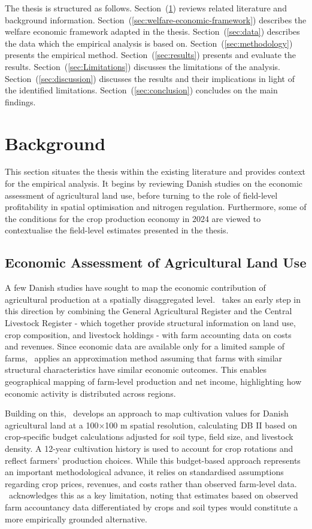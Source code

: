 \documentclass[12pt]{article}
\begin{document}
The thesis is structured as follows. Section~(\ref{sec:background}) reviews related literature and background information. 
Section~(\ref{sec:welfare-economic-framework}) describes the welfare economic framework adapted in the thesis.
Section~(\ref{sec:data}) describes the data which the empirical analysis is based on.
Section~(\ref{sec:methodology}) presents the empirical method.
Section~(\ref{sec:results}) presents and evaluate the results.
Section~(\ref{sec:Limitations}) discusses the limitations of the analysis.
Section~(\ref{sec:discussion}) discusses the results and their implications in light of the identified limitations.
Section~(\ref{sec:conclusion}) concludes on the main findings. 


\newpage


\section{Background}
\label{sec:background}
This section situates the thesis within the existing literature and provides context for the empirical analysis. It begins by reviewing Danish studies on the economic assessment of agricultural land use, before turning to the role of field-level profitability in spatial optimisation and nitrogen regulation. 
Furthermore, some of the conditions for the crop production economy in 2024 are viewed to contextualise the field-level estimates presented in the thesis.

\subsection{Economic Assessment of Agricultural Land Use}
A few Danish studies have sought to map the economic contribution of agricultural production at a spatially disaggregated level. \cite{Jensen2010}~takes an early step in this direction by combining the General Agricultural Register and the Central Livestock Register  - which together provide structural information on land use, crop composition, and livestock holdings - with farm accounting data on costs and revenues. Since economic data are available only for a limited sample of farms, \cite{Jensen2010}~applies an approximation method assuming that farms with similar structural characteristics have similar economic outcomes. This enables geographical mapping of farm-level production and net income, highlighting how economic activity is distributed across regions. 

Building on this, \cite{Pedersen2022}~develops an approach to map cultivation values for Danish agricultural land at a 100$\times$100 m spatial resolution, calculating DB II based on crop-specific budget calculations adjusted for soil type, field size, and livestock density. A 12-year cultivation history is used to account for crop rotations and reflect farmers' production choices. While this budget-based approach represents an important methodological advance, it relies on standardised assumptions regarding crop prices, revenues, and costs rather than observed farm-level data. \cite{Pedersen2022}~acknowledges this as a key limitation, noting that estimates based on observed farm accountancy data differentiated by crops and soil types would constitute a more empirically grounded alternative. 
\end{document}
